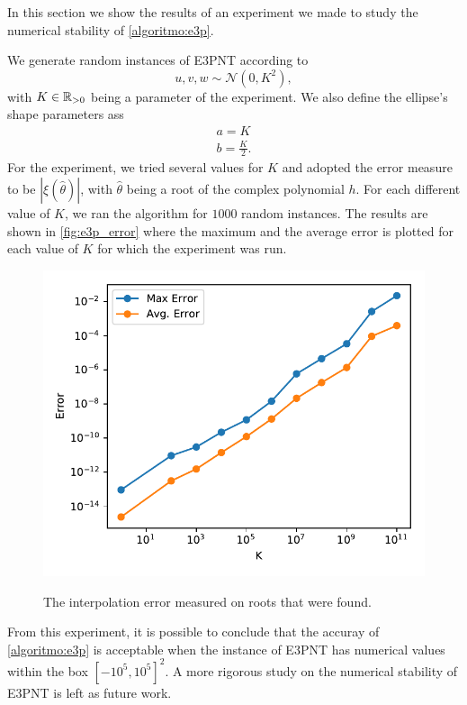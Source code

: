 In this section we show the results of an experiment we made to study the numerical stability of \autoref{algoritmo:e3p}. 

We generate random instances of E3PNT according to
\begin{equation}
u, v, w \sim \mathcal{N}(0, K^2),
\end{equation}
with $K\in \mathbb{R}_{>0}$ being a parameter of the experiment. We also define the ellipse's shape parameters ass
\begin{align}
	a = K\\
	b = \frac{K}{2}.
\end{align}
For the experiment, we tried several values for $K$ and adopted the error measure to be $|\xi(\hat{\theta})|$, with $\hat{\theta}$ being a root of the complex polynomial $h$. 
For each different value of $K$, we ran the algorithm for $1000$ random instances. The results are shown in \autoref{fig:e3p_error} where the maximum and the average error  is plotted for each value of $K$ for which the experiment was run.

\begin{figure}[H]
	\centering
	\caption{The interpolation error measured on roots that were found.}
	\includegraphics{tex/figures/e3p_error}
	\fautor
	\label{fig:e3p_error}
\end{figure}


From this experiment, it is possible to conclude that the accuray of \autoref{algoritmo:e3p} is acceptable when the instance of E3PNT has numerical values within the box $[-10^5, 10^5]^2$. A more rigorous study on the numerical stability of E3PNT is left as future work.

